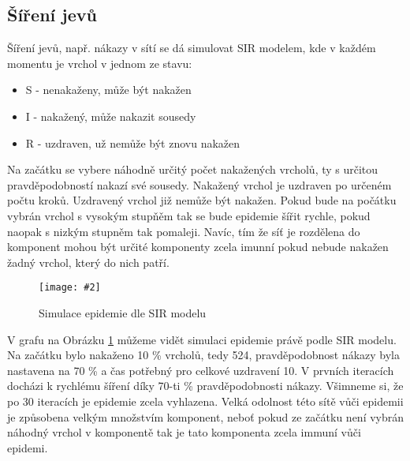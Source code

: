 \documentclass[a4paper,12pt]{article}
\newcommand{\image}[4]{\begin{figure}[h!] \centering \texttt{[image: \#2]} \caption{#4} \label{#3} \end{figure}}
\begin{document}
\FloatBarrier

\subsection{Šíření jevů}
Šíření jevů, např. nákazy v sítí se dá simulovat SIR modelem, kde v každém momentu je vrchol v jednom ze stavu:
\begin{itemize}
    \item S - nenakaženy, může být nakažen
    \item I - nakažený, může nakazit sousedy
    \item R - uzdraven, už nemůže být znovu nakažen
\end{itemize}

Na začátku se vybere náhodně určitý počet nakažených vrcholů, ty s určitou pravděpodobností nakazí své sousedy. Nakažený vrchol je uzdraven po určeném počtu kroků.
Uzdravený vrchol již nemůže být nakažen. Pokud bude na počátku vybrán vrchol s vysokým stupňěm tak se bude epidemie šířit rychle, pokud naopak s nizkým stupněm tak pomaleji.
Navíc, tím že síť je rozdělena do komponent mohou být určité komponenty zcela imunní pokud nebude nakažen žadný vrchol, který do nich patří. 


\image{0.8}{../grafy/sir.pdf}{fig:sir}{Simulace epidemie dle SIR modelu}

V grafu na Obrázku \ref{fig:sir} můžeme vidět simulaci epidemie právě podle SIR modelu. Na začátku bylo nakaženo 10 \% vrcholů, tedy 524, pravděpodobnost nákazy byla 
nastavena na 70 \% a čas potřebný pro celkové uzdravení 10. V prvních iteracích docházi k rychlému šíření díky 70-ti \% pravděpodobnosti nákazy. Všimneme si, že po 30 iteracích je epidemie zcela vyhlazena. Velká odolnost této sítě vůči epidemii je
způsobena velkým množstvím komponent, neboť pokud ze začátku není vybrán náhodný vrchol v komponentě tak je tato komponenta zcela immuní vůči epidemi.




\end{document}
